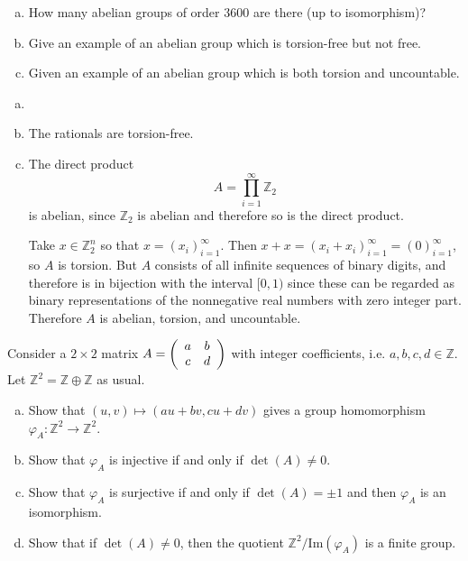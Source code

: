 \documentclass{article}
\newcounter{Problem}
\newenvironment{Problem}{\begin{Exercise}[name={Problem},
                                          counter={Problem}]}
                        {\end{Exercise}}
\begin{document}
\pagebreak

\begin{Problem}
\begin{enumerate}[(a)]
  \item{
    How many abelian groups of order 3600 are there (up to isomorphism)?
  }
  \item{
    Give an example of an abelian group which is torsion-free but not free.
  }
  \item{
    Given an example of an abelian group which is both torsion and uncountable.
  }
\end{enumerate}
\end{Problem}

\begin{Answer}
\begin{enumerate}[(a)]
  \item{}
  \item{
    The rationals are torsion-free.
  }
  \item{
    The direct product
    $$
    A = \prod_{i=1}^\infty \mathbb{Z}_2
    $$
    is abelian, since $\mathbb{Z}_2$ is abelian and therefore so is
    the direct product.

    Take $x \in \mathbb{Z}_2^n$ so that $x = (x_i)_{i=1}^\infty$. Then
    $x + x = (x_i + x_i)_{i=1}^\infty = (0)_{i=1}^\infty$, so $A$ is torsion.
    But $A$ consists of all infinite sequences of binary digits, and
    therefore is in bijection with the interval $[0, 1)$ since these
    can be regarded as binary representations of the nonnegative real
    numbers with zero integer part.
    Therefore $A$ is abelian, torsion, and uncountable.
  }
\end{enumerate}
\end{Answer}

\pagebreak

\begin{Problem}
Consider a $2 \times 2$ matrix
$A = \left(\begin{array}{c c}
       a & b \\ c & d
     \end{array}\right)$
with integer coefficients, i.e.
$a, b, c, d \in \mathbb{Z}$. Let
$\mathbb{Z}^2 = \mathbb{Z} \oplus \mathbb{Z}$ as usual.
\begin{enumerate}[(a)]
  \item{
    Show that $(u, v) \mapsto (au + bv, cu + dv)$ gives a group
    homomorphism $\varphi_A : \mathbb{Z}^2 \to \mathbb{Z}^2$.
  }
  \item{
    Show that $\varphi_A$ is injective if and only if
    $\det(A) \neq 0$.
  }
  \item{
    Show that $\varphi_A$ is surjective if and only if
    $\det(A) = \pm 1$ and then $\varphi_A$ is an isomorphism.
  }
  \item{
    Show that if $\det(A) \neq 0$, then the quotient
    $\mathbb{Z}^2 / \mathrm{Im}(\varphi_A)$ is a finite group.
  }
\end{enumerate}
\end{Problem}
\end{document}
